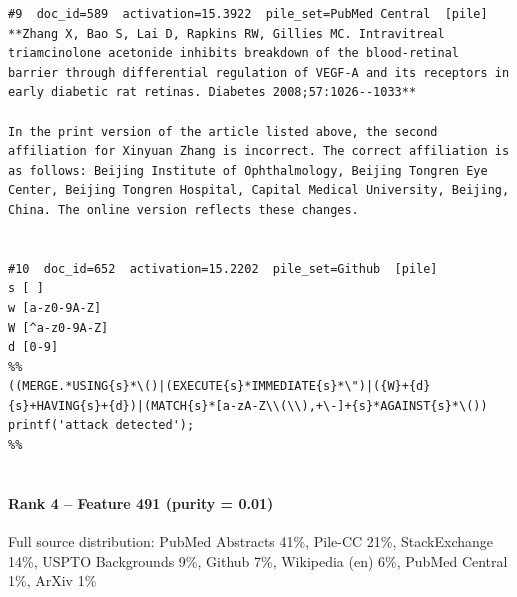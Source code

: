 \begin{verbatim}
#9  doc_id=589  activation=15.3922  pile_set=PubMed Central  [pile]
**Zhang X, Bao S, Lai D, Rapkins RW, Gillies MC. Intravitreal triamcinolone acetonide inhibits breakdown of the blood-retinal barrier through differential regulation of VEGF-A and its receptors in early diabetic rat retinas. Diabetes 2008;57:1026--1033**

In the print version of the article listed above, the second affiliation for Xinyuan Zhang is incorrect. The correct affiliation is as follows: Beijing Institute of Ophthalmology, Beijing Tongren Eye Center, Beijing Tongren Hospital, Capital Medical University, Beijing, China. The online version reflects these changes.


#10  doc_id=652  activation=15.2202  pile_set=Github  [pile]
s [ ]
w [a-z0-9A-Z]
W [^a-z0-9A-Z]
d [0-9]
%%
((MERGE.*USING{s}*\()|(EXECUTE{s}*IMMEDIATE{s}*\")|({W}+{d}{s}+HAVING{s}+{d})|(MATCH{s}*[a-zA-Z\\(\\),+\-]+{s}*AGAINST{s}*\()) printf('attack detected');
%%


\end{verbatim}

\paragraph*{Rank 4 -- Feature 491 (purity = 0.01)}

Full source distribution: PubMed Abstracts 41\%, Pile-CC 21\%, StackExchange 14\%, USPTO Backgrounds 9\%, Github 7\%, Wikipedia (en) 6\%, PubMed Central 1\%, ArXiv 1\%

